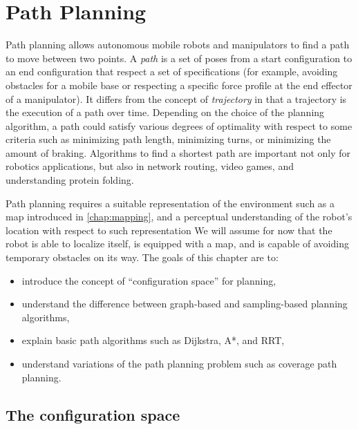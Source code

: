 \chapter{Path Planning}\label{chap:pathplanning}

Path planning allows autonomous mobile robots and manipulators to find a path to move between two points.
A \textsl{path} is a set of poses from a start configuration to an end configuration that respect a set of specifications (for example, avoiding obstacles for a mobile base or respecting a specific force profile at the end effector of a manipulator). It differs from the concept of \textsl{trajectory} in that a trajectory is the execution of a path over time.
Depending on the choice of the planning algorithm, a path could satisfy various degrees of optimality with respect to some criteria such as minimizing path length, minimizing turns, or minimizing the amount of braking.
Algorithms to find a shortest path are important not only for robotics applications, but also in network routing, video games, and understanding protein folding.

Path planning requires a suitable representation of the environment such as a map introduced in \cref{chap:mapping}, and a perceptual understanding of the robot's location with respect to such representation We will assume for now that the robot is able to localize itself, is equipped with a map, and is capable of avoiding temporary obstacles on its way. The goals of this chapter are to:

\begin{itemize}
\item introduce the concept of ``configuration space'' for planning,
\item understand the difference between graph-based and sampling-based planning algorithms,
\item explain basic path algorithms such as Dijkstra, A*, and RRT,
\item understand variations of the path planning problem such as coverage path planning.
\end{itemize}

\section{The configuration space}

